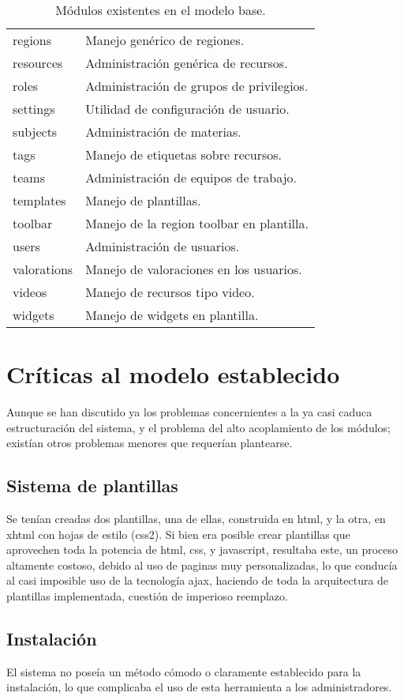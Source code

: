 \begin{description}
\begin{table}
\begin{tabular}{l|l}
regions & Manejo genérico de regiones. \\
resources & Administración genérica de recursos. \\
roles & Administración de grupos de privilegios. \\
settings & Utilidad de configuración de usuario. \\
subjects & Administración de materias. \\
tags & Manejo de etiquetas sobre recursos. \\
teams & Administración de equipos de trabajo. \\
templates & Manejo de plantillas. \\
toolbar & Manejo de la region toolbar en plantilla. \\
users & Administración de usuarios. \\
valorations & Manejo de valoraciones en los usuarios. \\
videos & Manejo de recursos tipo video. \\
widgets & Manejo de widgets en plantilla. \\
\end{tabular}
\caption{Módulos existentes en el modelo base.}
\label{modulos_base}
\end{table}

\section{Críticas al modelo establecido}
Aunque se han discutido ya los problemas concernientes a la ya casi caduca estructuración del sistema, y el problema del
alto acoplamiento de los módulos; existían otros problemas menores que requerían plantearse.

\subsection{Sistema de plantillas}
Se tenían creadas dos plantillas, una de ellas, construida en html, y la otra, en xhtml con hojas de estilo (css2). Si
bien era posible crear plantillas que aprovechen toda la potencia de html, css, y javascript, resultaba este, un proceso
altamente costoso, debido al uso de paginas muy personalizadas, lo que conducía al casi imposible uso de la tecnología
ajax, haciendo de toda la arquitectura de plantillas implementada, cuestión de imperioso reemplazo.

\subsection{Instalación}
El sistema no poseía un método cómodo o claramente establecido para la instalación, lo que complicaba el uso de esta
herramienta a los administradores.


\end{description}
